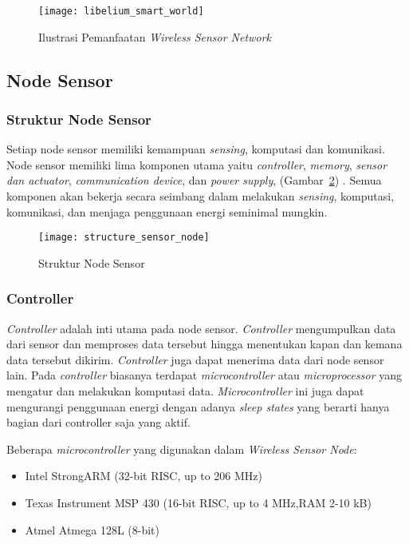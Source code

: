 \begin{figure} [H]
	\centering  
	\texttt{[image: libelium\_smart\_world]}  
	\caption[Ilustrasi Pemanfaatan \textit{Wireless Sensor Network}]{Ilustrasi Pemanfaatan \textit{Wireless Sensor Network}} 
	\label{fig:smartworld} 
\end{figure} 


\subsection{Node Sensor}
\subsubsection{Struktur Node Sensor}
Setiap node sensor memiliki kemampuan \textit{sensing}, komputasi dan komunikasi. Node sensor memiliki lima komponen utama yaitu \textit{controller}, \textit{memory}, \textit{sensor dan actuator}, \textit{communication device}, dan \textit{power supply}, (Gambar~\ref{fig:structure_sensor_node}) \cite{protocol:0:protocol}. Semua komponen akan bekerja secara seimbang dalam melakukan \textit{sensing}, komputasi, komunikasi, dan menjaga penggunaan energi seminimal mungkin. 

\begin{figure} [H]
	\centering  
	\texttt{[image: structure\_sensor\_node]}  
	\caption[Struktur Node Sensor]{Struktur Node Sensor} 
	\label{fig:structure_sensor_node} 
\end{figure} 

\subsubsection{Controller}
\textit{Controller} adalah inti utama pada node sensor. \textit{Controller} mengumpulkan data dari sensor dan memproses data tersebut hingga menentukan kapan dan kemana data tersebut dikirim. \textit{Controller} juga dapat menerima data dari node sensor lain. Pada \textit{controller} biasanya terdapat \textit{microcontroller} atau \textit{microprocessor} yang mengatur dan melakukan komputasi data. \textit{Microcontroller} ini juga dapat mengurangi penggunaan energi dengan adanya \textit{sleep states} yang berarti hanya bagian dari controller saja yang aktif.

Beberapa \textit{microcontroller} yang digunakan dalam \textit{Wireless Sensor Node}:
\begin{itemize}
	\item Intel StrongARM (32-bit RISC, up to 206 MHz)
	\item Texas Instrument MSP 430 (16-bit RISC, up to 4 MHz,RAM 2-10 kB)
	\item Atmel Atmega 128L (8-bit)
\end{itemize}

